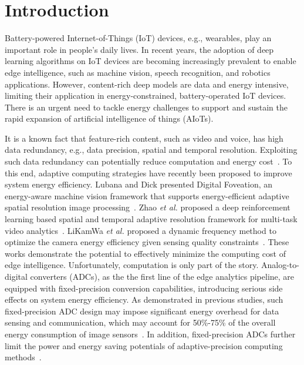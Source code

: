 \section{Introduction}

Battery-powered Internet-of-Things (IoT) devices, e.g., wearables, play an important role in people's daily lives.
In recent years, the adoption of deep learning algorithms on IoT devices are becoming increasingly prevalent to enable edge
intelligence, such as machine vision, speech recognition, and robotics applications. However, content-rich deep models are data 
and energy intensive, limiting their application in energy-constrained, battery-operated IoT devices. There is an urgent need to 
tackle energy challenges to support and sustain the rapid expansion of artificial intelligence of things (AIoTs).

It is a known fact that feature-rich content, such as video and voice, has high data redundancy, e.g., data precision, spatial
and temporal resolution. Exploiting such data redundancy
can potentially reduce computation and energy cost~\cite{lubana_digital_2018, zhao_reinforcement-learning-based_2022}. 
To this end, adaptive computing strategies have recently been proposed to improve system energy efficiency. 
Lubana and Dick presented Digital Foveation, an energy-aware machine vision framework that supports energy-efficient adaptive spatial resolution image processing~\cite{lubana_digital_2018}. 
Zhao {\it et al.} proposed a deep reinforcement learning based spatial and temporal adaptive resolution framework for multi-task video analytics~\cite{zhao_reinforcement-learning-based_2022}. 
LiKamWa {\it et al.} proposed a dynamic frequency method to optimize the camera energy efficiency given sensing quality constraints~\cite{likamwa_energy_2013}. These works demonstrate the potential to effectively minimize the computing cost of edge intelligence. 
Unfortunately, computation is only part of the story. Analog-to-digital converters (ADCs), as the the first line of the edge 
analytics pipeline, are equipped with fixed-precision conversion capabilities, introducing serious side effects on system energy 
efficiency.  As demonstrated in previous studies, such fixed-precision ADC design may impose significant energy overhead for
data sensing and communication, which may account for 50\%-75\% of the overall energy consumption of 
image sensors~\cite{choi_energyillumination-adaptive_2015,takayanagi_125-inch_2005,kitamura_33-megapixel_2012}. 
In addition, fixed-precision ADCs further limit the power and energy saving potentials of adaptive-precision computing methods~\cite{leibe_xnor-net_2016,li_ternary_2016,park_energy-efficient_2018}.

